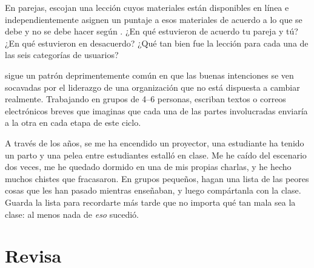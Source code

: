 
En parejas,
escojan una lección cuyos materiales están disponibles en línea
e independientemente asignen un puntaje a esos materiales de acuerdo a lo que se debe y no se debe hacer según
.
¿En qué estuvieron de acuerdo tu pareja y tú?
¿En qué estuvieron en desacuerdo?
¿Qué tan bien fue la lección para cada una de las seis categorías de usuarios?


\cite{Coco2018} sigue un patrón deprimentemente común
en que las buenas intenciones se ven socavadas por
el liderazgo de una organización que no está dispuesta a cambiar realmente.
Trabajando en grupos de 4--6 personas,
escriban textos o correos electrónicos breves que imaginas que cada una de las partes involucradas enviaría a la otra
en cada etapa de este ciclo.


A través de los años,
se me ha encendido un proyector,
una estudiante ha tenido un parto
y una pelea entre estudiantes estalló en clase.
Me he caído del escenario dos veces,
me he quedado dormido en una de mis propias charlas,
y he hecho muchos chistes que fracasaron.
En grupos pequeños,
hagan una lista de las peores cosas que les han pasado mientras enseñaban,
y luego compártanla con la clase.
Guarda la lista para recordarte más tarde que no importa qué tan mala sea la clase:
al menos nada de \emph{eso} sucedió.

\section*{Revisa}

